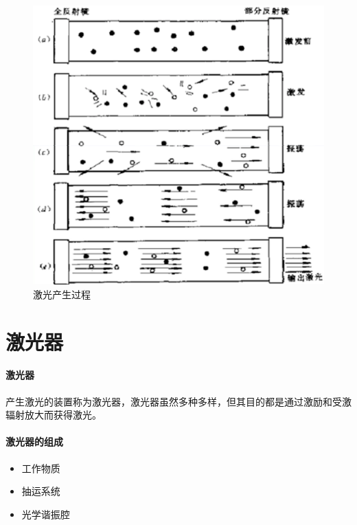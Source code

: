\begin{figure}[!htbp]
	\centering
	\includegraphics[width=\linewidth]{figure/Chapter2/激光的产生过程}
	\caption{激光产生过程}
	\label{fig:Chpater2-激光产生过程}
\end{figure}

\section{激光器} %

\paragraph{激光器}产生激光的装置称为激光器，激光器虽然多种多样，但其目的都是通过激励和受激辐射放大而获得激光。
\paragraph{激光器的组成}\begin{itemize}
	\item 工作物质
	\item 抽运系统
	\item 光学谐振腔
\end{itemize}
